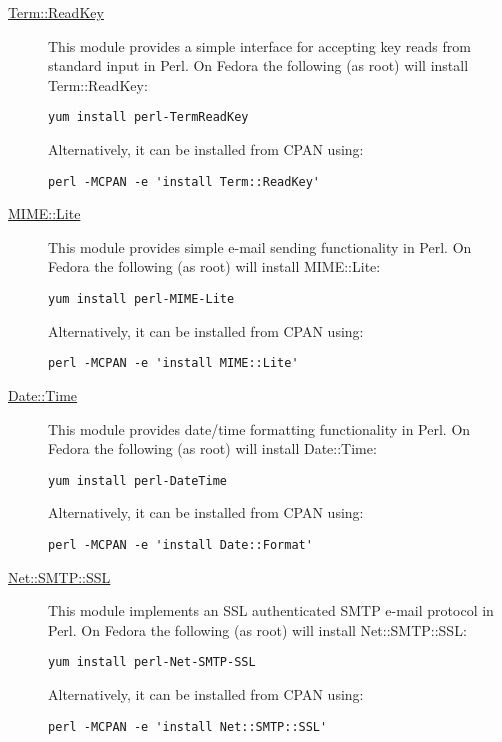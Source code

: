 \begin{description}
  \item [\href{http://search.cpan.org/dist/TermReadKey/ReadKey.pm}{{\normalfont \ttfamily Term::ReadKey}}] This module provides a simple interface for accepting key reads from standard input in Perl. On Fedora the following (as root) will install {\normalfont \ttfamily Term::ReadKey}:
\begin{verbatim}
yum install perl-TermReadKey
\end{verbatim}
Alternatively, it can be installed from CPAN using:
\begin{verbatim}
perl -MCPAN -e 'install Term::ReadKey'
\end{verbatim}
  \item [\href{http://search.cpan.org/~rjbs/MIME-Lite-3.027/lib/MIME/Lite.pm}{{\normalfont \ttfamily MIME::Lite}}] This module provides simple e-mail sending functionality in Perl. On Fedora the following (as root) will install {\normalfont \ttfamily MIME::Lite}:
\begin{verbatim}
yum install perl-MIME-Lite
\end{verbatim}
Alternatively, it can be installed from CPAN using:
\begin{verbatim}
perl -MCPAN -e 'install MIME::Lite'
\end{verbatim}
  \item [\href{http://search.cpan.org/~gbarr/TimeDate-1.20/lib/Date/Format.pm}{{\normalfont \ttfamily Date::Time}}] This module provides date/time formatting functionality in Perl. On Fedora the following (as root) will install {\normalfont \ttfamily Date::Time}:
\begin{verbatim}
yum install perl-DateTime
\end{verbatim}
Alternatively, it can be installed from CPAN using:
\begin{verbatim}
perl -MCPAN -e 'install Date::Format'
\end{verbatim}
  \item [\href{http://search.cpan.org/~cwest/Net-SMTP-SSL-1.01/lib/Net/SMTP/SSL.pm}{{\normalfont \ttfamily Net::SMTP::SSL}}] This module implements an SSL authenticated SMTP e-mail protocol in Perl. On Fedora the following (as root) will install {\normalfont \ttfamily Net::SMTP::SSL}:
\begin{verbatim}
yum install perl-Net-SMTP-SSL
\end{verbatim}
Alternatively, it can be installed from CPAN using:
\begin{verbatim}
perl -MCPAN -e 'install Net::SMTP::SSL'
\end{verbatim}


\end{description}
